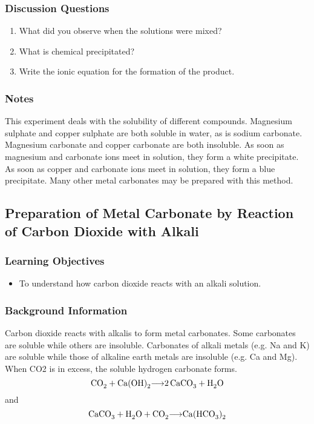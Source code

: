 \subsubsection*{Discussion Questions}
\begin{enumerate}
\item{What did you observe when the solutions were mixed?}
\item{What is chemical precipitated?}
\item{Write the ionic equation for the formation of the product.}
\end{enumerate}

\subsubsection*{Notes}
This experiment deals with the solubility of different compounds. Magnesium sulphate and copper sulphate are both soluble in water, as is sodium carbonate. Magnesium carbonate and copper carbonate are both insoluble. As soon as magnesium and carbonate ions meet in solution, they form a white precipitate. As soon as copper and carbonate ions meet in solution, they form a blue precipitate. Many other metal carbonates may be prepared with this method.

\subsection{Preparation of Metal Carbonate by Reaction of Carbon Dioxide with Alkali}

\subsubsection*{Learning Objectives}
\begin{itemize}
\item{To understand how carbon dioxide reacts with an alkali solution.}
\end{itemize}

\subsubsection*{Background Information}
Carbon dioxide reacts with alkalis to form metal carbonates. Some carbonates are soluble while others are insoluble. Carbonates of alkali metals (e.g. Na and K) are soluble while those of alkaline earth metals are insoluble (e.g. Ca and Mg). When CO2 is in excess, the soluble hydrogen carbonate forms.
$$\ce{CO2 + Ca(OH)2 $\longrightarrow$ 2CaCO3 + H2O}$$
and $$\ce{CaCO3 + H2O +  CO2 $\longrightarrow$ Ca(HCO3)2}$$

